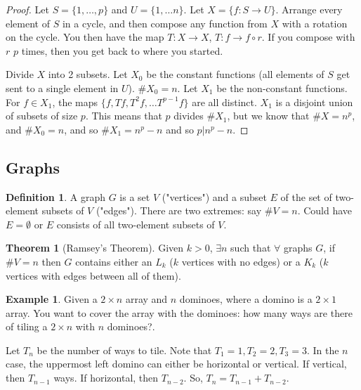 \documentclass[12pt]{article}
\theoremstyle{definition}
\newtheorem{theorem}{Theorem}
\newtheorem{defn}{Definition}
\newtheorem{exmp}{Example}[section]
\begin{document}
\begin{proof}
    Let $S = \{1, \ldots, p\}$ and $U = \{1, \ldots n\}$. Let $X = \{f:
    S \rightarrow U\}$. Arrange every element of $S$ in a cycle, and
    then compose any function from $X$ with a rotation on the cycle.
    You then have the map $T: X \rightarrow X$, $T: f \rightarrow f
    \circ r$. If you compose with $r$ $p$ times, then you get back to
    where you started.

    Divide $X$ into 2 subsets. Let $X_0$ be the constant functions (all
    elements of $S$ get sent to a single element in $U$). $\#X_0 = n$.
    Let $X_1$ be the non-constant functions. For $f \in X_1$, the maps
    $\{f, Tf, T^2f, \ldots T^{p-1}f\}$ are all distinct. $X_1$ is a disjoint
    union of subsets of size $p$. This means that $p$ divides $\#X_1$, but we
    know that $\#X = n^p$, and $\#X_0 = n$, and so $\#X_1 = n^p- n$ and so $p |
    n^p - n$.
\end{proof}

\subsection{Graphs}

\begin{defn}
    A graph $G$ is a set $V$ ("vertices") and a subset $E$ of the set of
    two-element subsets of $V$ ("edges"). There are two extremes: say $\#V =
    n$. Could have $E = \emptyset$ or $E$ consists of all two-element subsets
    of $V$. 
\end{defn}

\begin{theorem}[Ramsey's Theorem]
    Given $k > 0$, $\exists n$ such that $\forall$ graphs $G$, if $\#V = n$
    then $G$ contains either an $L_k$ ($k$ vertices with no edges) or a $K_k$
    ($k$ vertices with edges between all of them).
\end{theorem}

\begin{exmp}
    Given a $2 \times n$ array and $n$ dominoes, where a domino is a $2 \times
    1$ array. You want to cover the array with the dominoes: how many ways are
    there of tiling a $2 \times n$ with $n$ dominoes?. 

    Let $T_n$ be the number of ways to tile. Note that $T_1 = 1, T_2 = 2, T_3 =
    3$. In the $n$ case, the uppermost left domino can either be horizontal or
    vertical. If vertical, then $T_{n-1}$ ways. If horizontal, then $T_{n-2}$.
    So, $T_n = T_{n-1} + T_{n-2}$.
\end{exmp}
\end{document}
